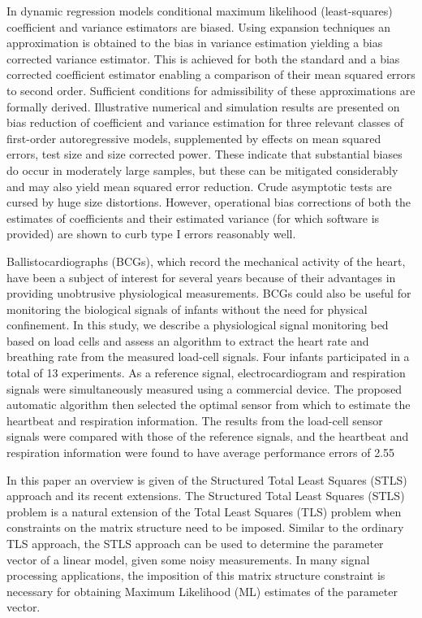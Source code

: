 \documentclass[11pt]{article}
\begin{document}
\citet{Kiviet14improved} In dynamic regression models conditional maximum likelihood (least-squares) coefficient and variance estimators are biased. Using expansion techniques an approximation is obtained to the bias in variance estimation yielding a bias corrected variance estimator. This is achieved for both the standard and a bias corrected coefficient estimator enabling a comparison of their mean squared errors to second order. Sufficient conditions for admissibility of these approximations are formally derived. Illustrative numerical and simulation results are presented on bias reduction of coefficient and variance estimation for three relevant classes of first-order autoregressive models, supplemented by effects on mean squared errors, test size and size corrected power. These indicate that substantial biases do occur in moderately large samples, but these can be mitigated considerably and may also yield mean squared error reduction. Crude asymptotic tests are cursed by huge size distortions. However, operational bias corrections of both the estimates of coefficients and their estimated variance (for which software is provided) are shown to curb type I errors reasonably well.


\citet{Lee16} Ballistocardiographs (BCGs), which record the mechanical activity of the heart, have been a subject of interest for several years because of their advantages in providing unobtrusive physiological measurements. BCGs could also be useful for monitoring the biological signals of infants without the need for physical confinement. In this study, we describe a physiological signal monitoring bed based on load cells and assess an algorithm to extract the heart rate and breathing rate from the measured load-cell signals. Four infants participated in a total of 13 experiments. As a reference signal, electrocardiogram and respiration signals were simultaneously measured using a commercial device. The proposed automatic algorithm then selected the optimal sensor from which to estimate the heartbeat and respiration information. The results from the load-cell sensor signals were compared with those of the reference signals, and the heartbeat and respiration information were found to have average performance errors of 2.55%

\citet{Lemmerling02} In this paper an overview is given of the Structured Total Least Squares (STLS) approach and its recent extensions. The Structured Total Least Squares (STLS) problem is a natural extension of the Total Least Squares (TLS) problem when constraints on the matrix structure need to be imposed. Similar to the ordinary TLS approach, the STLS approach can be used to determine the parameter vector of a linear model, given some noisy measurements. In many signal processing applications, the imposition of this matrix structure constraint is necessary for obtaining Maximum Likelihood (ML) estimates of the parameter vector.
\end{document}
